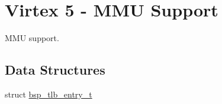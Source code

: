 \hypertarget{group__Virtex5MMU}{}\section{Virtex 5 -\/ M\+MU Support}
\label{group__Virtex5MMU}


M\+MU support.  


\subsection*{Data Structures}
\begin{DoxyCompactItemize}
\item 
struct \mbox{\hyperlink{structbsp__tlb__entry__t}{bsp\+\_\+tlb\+\_\+entry\+\_\+t}}
\end{DoxyCompactItemize}
